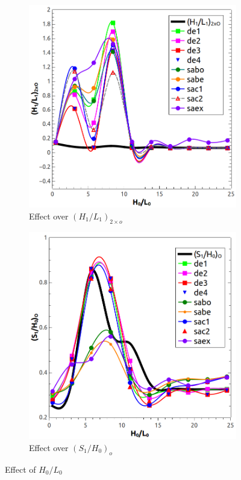 \documentclass[10pt,fleqn,a4paper,twoside]{article}
\begin{document}
\begin{figure}[!h]
\centering
	\begin{subfigure}{0.52\textwidth}
		\centering
		\includegraphics[width=1\linewidth]{imgs/4dof/h0l0-h1l1.png}
		\caption{ {\small Effect over $(H_{1}/L_{1})_{2\times o}$}}
		\label{figure03:sub1}
	\end{subfigure}%
	\begin{subfigure}{0.52\textwidth}
		\centering
		\includegraphics[width=1\linewidth]{imgs/4dof/h0l0_s1h0.png}
		\caption{ {\small Effect over $(S_{1}/H_{0})_{o}$}}
		\label{figure03:sub2}
	\end{subfigure}%
\caption{Effect of $H_{0}/L_{0}$}
\label{figure03}
\end{figure}
\end{document}
